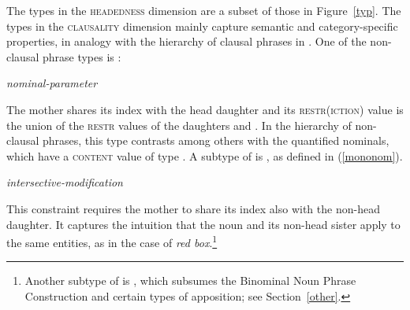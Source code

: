 \documentclass[output=paper
	        ,collection
	        ,collectionchapter
 	        ,biblatex
                ,babelshorthands
                ,newtxmath
                ,draftmode
                ,colorlinks, citecolor=brown
]{langscibook}
\begin{document}
The types in the \textsc{headedness} dimension are a subset of those in Figure~\ref{typ}.  
The types in the \textsc{clausality} dimension mainly capture semantic and 
category-specific properties, in analogy with the hierarchy of clausal phrases 
in \citet{GS00}. One of the non-clausal phrase types is : 

\begin{exe}
\ex\label{param} 
\emph{nominal-parameter} \impl
{}
\end{exe}

\noindent
The mother shares its index with the head daughter  and 
its \textsc{restr(iction)} value is the union of the \textsc{restr} values 
of the daughters  and . 
In the hierarchy of non-clausal phrases, this type contrasts among others with 
the quantified nominals, which have a \textsc{content} value of type 
 \citep[203--205]{GS00}. A subtype of  is  
, as defined in (\ref{mononom}).

\begin{exe}
\ex\label{mononom} 
\emph{intersective-modification} \impl
{}
\end{exe}

\noindent 
This constraint requires the mother to share its index also with the 
non-head daughter. It captures the intuition that the 
noun and its non-head sister apply to the same entities, as in 
the case of \emph{red box}.\footnote{Another subtype of  
is , which subsumes 
the Binominal Noun Phrase Construction and certain types of apposition;
see Section~\ref{other}.}  
\end{document}
